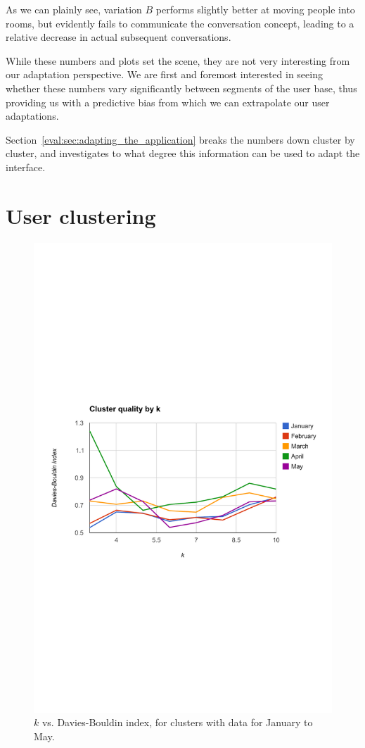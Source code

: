 As we can plainly see, variation $B$ performs slightly better at moving people into rooms, but evidently fails to communicate the conversation concept, leading to a relative decrease in actual subsequent conversations.

While these numbers and plots set the scene, they are not very interesting from our adaptation perspective. We are first and foremost interested in seeing whether these numbers vary significantly between segments of the user base, thus providing us with a predictive bias from which we can extrapolate our user adaptations.

Section~\ref{eval:sec:adapting_the_application} breaks the numbers down cluster by cluster, and investigates to what degree this information can be used to adapt the interface.

\section{User clustering} %
\label{eval:sec:clustering}

\begin{figure}[h]
  \centering
    \includegraphics[width=\textwidth]{Figures/plots/k-vs-db/jan-may}
    \caption{$k$ vs. Davies-Bouldin index, for clusters with data for January to May.}
    \label{fig:k_vs_db}
\end{figure}

